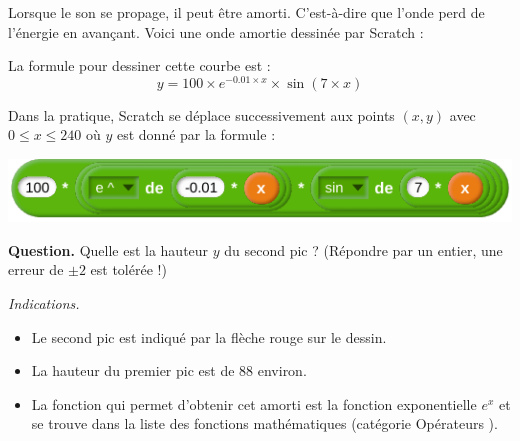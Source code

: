\documentclass[class=report,crop=false, 12pt]{standalone}
\begin{document}
\begin{enigme}

Lorsque le son se propage, il peut être amorti. C'est-à-dire que l'onde perd de l'énergie en avançant. Voici une onde amortie dessinée par Scratch :
%


La formule pour dessiner cette courbe est :
$$y = 100 \times e^{-0.01 \times x} \times \sin(7 \times x)$$

Dans la pratique, Scratch se déplace successivement aux points $(x,y)$ avec $0 \le x \le 240$ où $y$ est donné par la formule :


\begin{center}
  \includegraphics[scale=\scalebloc]{bloc-09-eg2} 
\end{center}



\textbf{Question.} Quelle est la hauteur $y$ du second pic ? (Répondre par un entier, une erreur de $\pm2$ est tolérée !)
\bigskip



\emph{Indications.} 
\begin{itemize}
  \item Le second pic est indiqué par la flèche rouge sur le dessin.
  \item La hauteur du premier pic est de $88$ environ.
  \item La fonction qui permet d'obtenir cet amorti est la fonction exponentielle $e^x$ et se trouve dans la liste des fonctions mathématiques (catégorie \og{}Opérateurs \fg{}).
\end{itemize}



\end{enigme}
\end{document}
